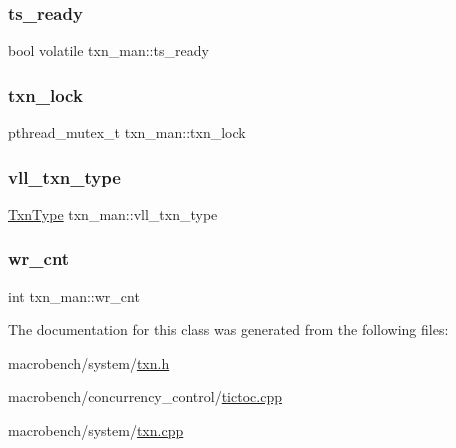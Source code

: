 \subsubsection{\texorpdfstring{ts\+\_\+ready}{ts\_ready}}
{\footnotesize\ttfamily bool volatile txn\+\_\+man\+::ts\+\_\+ready}

\mbox{\label{classtxn__man_abfdf95f4a0acbcbb8a72cd56ad111553}} 
\subsubsection{\texorpdfstring{txn\+\_\+lock}{txn\_lock}}
{\footnotesize\ttfamily pthread\+\_\+mutex\+\_\+t txn\+\_\+man\+::txn\+\_\+lock}

\mbox{\label{classtxn__man_a1cee31702c8e159b1302a7a7b1880dd8}} 
\subsubsection{\texorpdfstring{vll\+\_\+txn\+\_\+type}{vll\_txn\_type}}
{\footnotesize\ttfamily \hyperlink{txn_8h_a171384e518db04097e0f3e6750129a2a}{Txn\+Type} txn\+\_\+man\+::vll\+\_\+txn\+\_\+type}

\mbox{\label{classtxn__man_af7984d5eb6137ae694aa34973921f08a}} 
\subsubsection{\texorpdfstring{wr\+\_\+cnt}{wr\_cnt}}
{\footnotesize\ttfamily int txn\+\_\+man\+::wr\+\_\+cnt}



The documentation for this class was generated from the following files\+:\begin{DoxyCompactItemize}
\item 
macrobench/system/\hyperlink{txn_8h}{txn.\+h}\item 
macrobench/concurrency\+\_\+control/\hyperlink{tictoc_8cpp}{tictoc.\+cpp}\item 
macrobench/system/\hyperlink{txn_8cpp}{txn.\+cpp}\end{DoxyCompactItemize}
